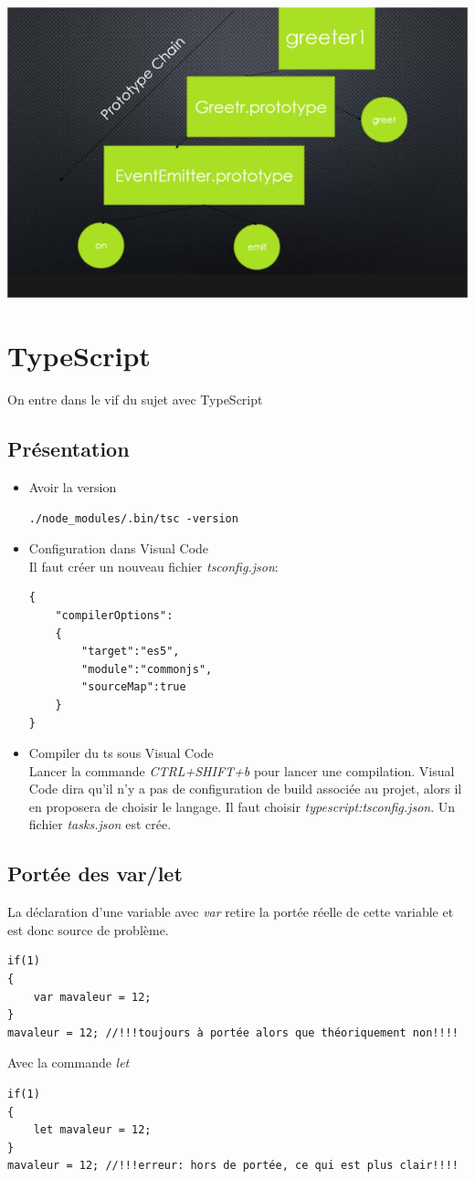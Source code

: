 \documentclass[12pt,oneside]{scrbook}
\begin{document}
\includegraphics{util_inherits.png}

\chapter{TypeScript}
On entre dans le vif du sujet avec TypeScript
\section{Présentation}
\begin{itemize}
\item Avoir la version
\begin{verbatim}
./node_modules/.bin/tsc -version
\end{verbatim}
\item Configuration dans Visual Code\\
Il faut créer un nouveau fichier \textit{tsconfig.json}:
\begin{verbatim}
{
    "compilerOptions":
    {
        "target":"es5",
        "module":"commonjs",
        "sourceMap":true
    }
}
\end{verbatim}
\item Compiler du ts sous Visual Code\\
Lancer la commande \textit{CTRL+SHIFT+b} pour lancer une compilation. Visual Code dira qu'il n'y a pas de configuration de build associée au projet, alors il en proposera de choisir le langage. Il faut choisir \textit{typescript:tsconfig.json}. Un fichier \textit{tasks.json} est crée.
\end{itemize}


\section{Portée des var/let}
La déclaration d'une variable avec \textit{var} retire la portée réelle de cette variable et est donc source de problème.
\begin{verbatim}
if(1)
{
    var mavaleur = 12;
}
mavaleur = 12; //!!!toujours à portée alors que théoriquement non!!!!
\end{verbatim}
Avec la commande \textit{let}
\begin{verbatim}
if(1)
{
    let mavaleur = 12;
}
mavaleur = 12; //!!!erreur: hors de portée, ce qui est plus clair!!!!
\end{verbatim}
\end{document}
